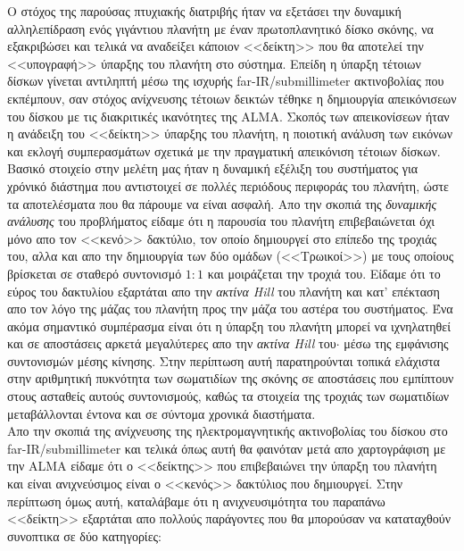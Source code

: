 Ο στόχος της παρούσας πτυχιακής διατριβής ήταν να εξετάσει την δυναμική αλληλεπίδραση ενός γιγάντιου πλανήτη με έναν πρωτοπλανητικό δίσκο σκόνης, να εξακριβώσει και τελικά να αναδείξει κάποιον <<δείκτη>> που θα αποτελεί την <<υπογραφή>> ύπαρξης του πλανήτη στο σύστημα. Επείδη η ύπαρξη τέτοιων δίσκων γίνεται αντιληπτή μέσω της ισχυρής {\en far-IR/submillimeter} ακτινοβολίας που εκπέμπουν, σαν στόχος ανίχνευσης τέτοιων δεικτών τέθηκε η δημιουργία  απεικόνισεων του δίσκου με τις διακριτικές ικανότητες της {\en ALMA}. Σκοπός των απεικονίσεων ήταν η ανάδειξη του <<δείκτη>> ύπαρξης του πλανήτη, η ποιοτική ανάλυση των εικόνων και εκλογή συμπερασμάτων σχετικά με την πραγματική απεικόνιση τέτοιων δίσκων.\\

Βασικό στοιχείο στην μελέτη μας ήταν η δυναμική εξέλιξη του συστήματος για χρόνικό διάστημα που αντιστοιχεί σε πολλές περιόδους περιφοράς του πλανήτη, ώστε τα αποτελέσματα που θα πάρουμε να είναι ασφαλή. Απο την σκοπιά της {\it δυναμικής ανάλυσης} του προβλήματος είδαμε ότι η παρουσία του πλανήτη επιβεβαιώνεται όχι μόνο απο τον <<κενό>> δακτύλιο, τον οποίο δημιουργεί στο επίπεδο της τροχιάς του, αλλα και απο την δημιουργία των δύο ομάδων (<<Τρωικοί>>) με τους οποίους βρίσκεται σε σταθερό συντονισμό $1:1$ και μοιράζεται την τροχιά του. Είδαμε ότι το εύρος του δακτυλίου εξαρτάται απο την {\it ακτίνα {\en Hill}} του πλανήτη και κατ' επέκταση απο τον λόγο της μάζας του πλανήτη προς την μάζα του αστέρα του συστήματος. Ένα ακόμα σημαντικό συμπέρασμα είναι ότι η  ύπαρξη του πλανήτη μπορεί να ιχνηλατηθεί και σε αποστάσεις αρκετά μεγαλύτερες απο την {\it ακτίνα {\en Hill}} του$\cdot$ μέσω της εμφάνισης συντονισμών μέσης κίνησης. Στην περίπτωση αυτή παρατηρούνται τοπικά ελάχιστα στην αριθμητική πυκνότητα των σωματιδίων της σκόνης σε αποστάσεις που εμπίπτουν στους ασταθείς αυτούς συντονισμούς, καθώς τα στοιχεία της τροχιάς των σωματιδίων μεταβάλλονται έντονα και σε σύντομα χρονικά διαστήματα.\\
Απο την σκοπιά της ανίχνευσης της ηλεκτρομαγνητικής ακτινοβολίας του δίσκου στο {\en far-IR/submillimeter} και τελικά όπως αυτή θα φαινόταν μετά απο χαρτογράφιση με την {\en ALMA} είδαμε ότι ο <<δείκτης>> που επιβεβαιώνει την ύπαρξη του πλανήτη και είναι ανιχνεύσιμος είναι ο <<κενός>> δακτύλιος που δημιουργεί. Στην περίπτωση όμως αυτή, καταλάβαμε ότι η ανιχνευσιμότητα του παραπάνω <<δείκτη>> εξαρτάται απο πολλούς παράγοντες που θα μπορούσαν να καταταχθούν συνοπτικα σε δύο κατηγορίες: 

